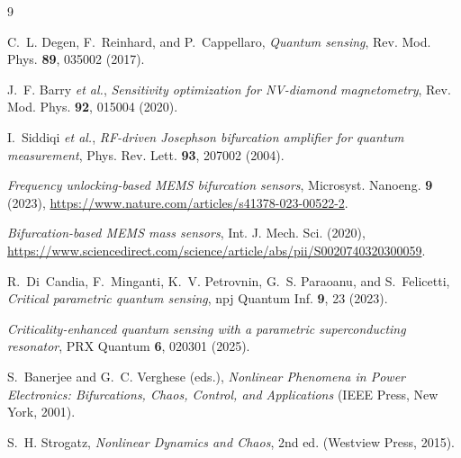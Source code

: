 \documentclass[11pt,a4paper]{article}
\begin{document}
\begin{thebibliography}{9}

C.~L. Degen, F.~Reinhard, and P.~Cappellaro,
\emph{Quantum sensing},
Rev. Mod. Phys. \textbf{89}, 035002 (2017).

J.~F. Barry \emph{et al.},
\emph{Sensitivity optimization for NV-diamond magnetometry},
Rev. Mod. Phys. \textbf{92}, 015004 (2020).

I.~Siddiqi \emph{et al.},
\emph{RF-driven Josephson bifurcation amplifier for quantum measurement},
Phys. Rev. Lett. \textbf{93}, 207002 (2004).

\emph{Frequency unlocking-based MEMS bifurcation sensors},
Microsyst. Nanoeng. \textbf{9} (2023),
\url{https://www.nature.com/articles/s41378-023-00522-2}.

\emph{Bifurcation-based MEMS mass sensors},
Int. J. Mech. Sci. (2020),
\url{https://www.sciencedirect.com/science/article/abs/pii/S0020740320300059}.

R.~Di~Candia, F.~Minganti, K.~V. Petrovnin, G.~S. Paraoanu, and S.~Felicetti,
\emph{Critical parametric quantum sensing},
npj Quantum Inf. \textbf{9}, 23 (2023).

\emph{Criticality-enhanced quantum sensing with a parametric superconducting
resonator},
PRX Quantum \textbf{6}, 020301 (2025).

S.~Banerjee and G.~C. Verghese (eds.),
\emph{Nonlinear Phenomena in Power Electronics: Bifurcations, Chaos, Control,
and Applications} (IEEE Press, New York, 2001).

S.~H. Strogatz,
\emph{Nonlinear Dynamics and Chaos}, 2nd ed. (Westview Press, 2015).

\end{thebibliography}
\end{document}
